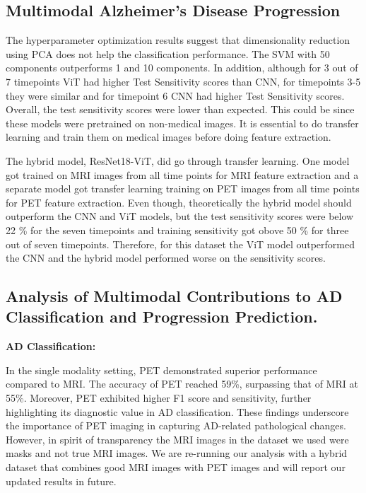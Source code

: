 \subsection{Multimodal Alzheimer's Disease Progression}
The hyperparameter optimization results suggest that dimensionality reduction using PCA does not help the classification performance. The SVM with 50 components outperforms 1 and 10 components. In addition, although for 3 out of 7 timepoints ViT had higher Test Sensitivity scores than CNN, for timepoints 3-5 they were similar and for timepoint 6 CNN had higher Test Sensitivity scores. Overall, the test sensitivity scores were lower than expected. This could be since these models were pretrained on non-medical images. It is essential to do transfer learning and train them on medical images before doing feature extraction. 

The hybrid model, ResNet18-ViT, did go through transfer learning. One model got trained on MRI images from all time points for MRI feature extraction and a separate model got transfer learning training on PET images from all time points for PET feature extraction. Even though, theoretically the hybrid model should outperform the CNN and ViT models, but the test sensitivity scores were below 22 \% for the seven timepoints and training sensitivity got obove 50 \% for three out of seven timepoints. Therefore, for this dataset the ViT model outperformed the CNN and the hybrid model performed worse on the sensitivity scores. 

\subsection{Analysis of Multimodal Contributions to AD Classification and Progression Prediction.} 

\textbf{AD Classification: }

In the single modality setting, PET demonstrated superior performance compared to MRI. The accuracy of PET reached 59\%, surpassing that of MRI at 55\%. Moreover, PET exhibited higher F1 score and sensitivity, further highlighting its diagnostic value in AD classification. These findings underscore the importance of PET imaging in capturing AD-related pathological changes. However, in spirit of transparency the MRI images in the dataset we used were masks and not true MRI images. We are re-running our analysis with a hybrid dataset that combines good MRI images with PET images and will report our updated results in future.  

